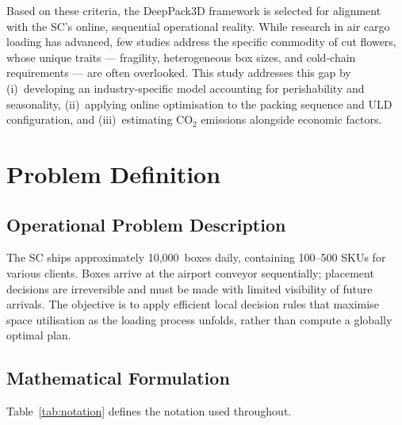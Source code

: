 \documentclass[12pt,a4paper]{article}
\begin{document}
Based on these criteria, the DeepPack3D framework \citep{Tsang2025}
is selected for alignment with the SC's online, sequential operational
reality.
While research in air cargo loading has advanced, few studies address
the specific commodity of cut flowers, whose unique traits ---
fragility, heterogeneous box sizes, and cold-chain requirements ---
are often overlooked.
This study addresses this gap by (i)~developing an industry-specific
model accounting for perishability and seasonality, (ii)~applying
online optimisation to the packing sequence and ULD configuration, and
(iii)~estimating CO$_2$ emissions alongside economic factors.


\section{Problem Definition}
\label{sec:problem}

\subsection{Operational Problem Description}

The SC ships approximately 10{,}000~boxes daily, containing 100--500
SKUs for various clients.
Boxes arrive at the airport conveyor sequentially; placement decisions
are irreversible and must be made with limited visibility of future
arrivals.
The objective is to apply efficient local decision rules that maximise
space utilisation as the loading process unfolds, rather than compute
a globally optimal plan.

\subsection{Mathematical Formulation}
\label{sec:formulation}

Table~\ref{tab:notation} defines the notation used throughout.
\end{document}
